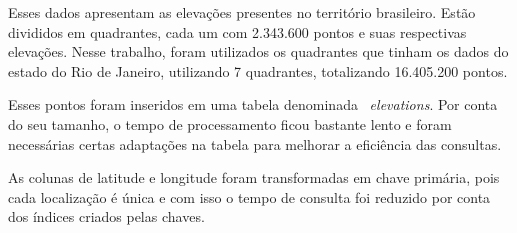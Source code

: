 \FloatBarrier

Esses dados apresentam as elevações presentes no território brasileiro. Estão divididos em quadrantes, cada um com 2.343.600 pontos e suas respectivas elevações. Nesse trabalho, foram utilizados os quadrantes que tinham os dados do estado do Rio de Janeiro, utilizando 7 quadrantes, totalizando 16.405.200 pontos.

Esses pontos foram inseridos em uma tabela denominada ~\textit{elevations}. Por conta do seu tamanho, o tempo de processamento ficou bastante lento e foram necessárias certas adaptações na tabela para melhorar a eficiência das consultas.

As colunas de latitude e longitude foram transformadas em chave primária, pois cada localização é única e com isso o tempo de consulta foi reduzido por conta dos índices criados pelas chaves.